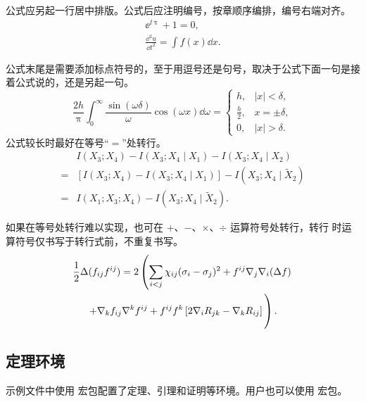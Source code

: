 公式应另起一行居中排版。公式后应注明编号，按章顺序编排，编号右端对齐。
\begin{gather}
  \ee^{\ii\uppi} + 1 = 0, \\
  \frac{\dd^2 u}{\dd t^2} = \int f(x) \dd x.
\end{gather}

公式末尾是需要添加标点符号的，至于用逗号还是句号，取决于公式下面一句是接着公式说的，还是另起一句。
\begin{equation}
  \frac{2h}{\uppi}\int_{0}^{\infty}\frac{\sin\left( \omega\delta \right)}{\omega}
  \cos\left( \omega x \right) \dd\omega = 
  \begin{cases}
    h, & \left| x \right| < \delta, \\
    \frac{h}{2}, & x = \pm \delta, \\
    0, & \left| x \right| > \delta.
  \end{cases}
\end{equation}
公式较长时最好在等号“$=$”处转行。
\begin{align}
    & I (X_3; X_4) - I (X_3; X_4 \mid X_1) - I (X_3; X_4 \mid X_2) \nonumber \\
  = & [I (X_3; X_4) - I (X_3; X_4 \mid X_1)] - I (X_3; X_4 \mid \tilde{X}_2) \\
  = & I (X_1; X_3; X_4) - I (X_3; X_4 \mid \tilde{X}_2).
\end{align}

如果在等号处转行难以实现，也可在 $+$、$-$、$\times$、$\div$ 运算符号处转行，转行
时运算符号仅书写于转行式前，不重复书写。
\begin{multline}
  \frac{1}{2} \Delta (f_{ij} f^{ij}) =
    2 \left(\sum_{i<j} \chi_{ij}(\sigma_{i} - \sigma_{j})^{2}
    + f^{ij} \nabla_{j} \nabla_{i} (\Delta f) \right. \\
  \left. + \nabla_{k} f_{ij} \nabla^{k} f^{ij} +
    f^{ij} f^{k} \left[2\nabla_{i}R_{jk}
    - \nabla_{k} R_{ij} \right] \vphantom{\sum_{i<j}} \right).
\end{multline}

\subsection{定理环境}

示例文件中使用  宏包配置了定理、引理和证明等环境。用户也可以使用
 宏包。

